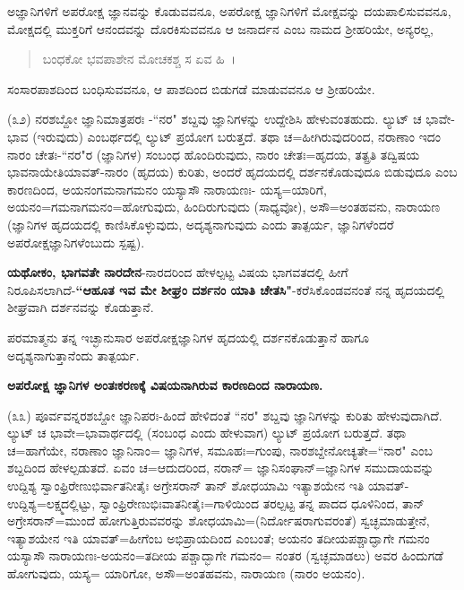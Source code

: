 
ಅಜ್ಞಾನಿಗಳಿಗೆ ಅಪರೋಕ್ಷ ಜ್ಞಾನವನ್ನು ಕೊಡುವವನೂ, ಅಪರೋಕ್ಷ ಜ್ಞಾನಿಗಳಿಗೆ ಮೋಕ್ಷವನ್ನು ದಯಪಾಲಿಸುವವನೂ, ಮೋಕ್ಷದಲ್ಲಿ ಮುಕ್ತರಿಗೆ ಆನಂದವನ್ನು ದೊರಕಿಸುವವನೂ ಆ ಜನಾರ್ದನ ಎಂಬ ನಾಮದ ಶ‍್ರೀಹರಿಯೇ, ಅನ್ಯರಲ್ಲ,

\begin{verse}
ಬಂಧಕೋ ಭವಪಾಶೇನ ಮೋಚಕಶ್ಚ ಸ ಏವ ಹಿ~।
\end{verse}


ಸಂಸಾರಪಾಶದಿಂದ ಬಂಧಿಸುವವನೂ, ಆ ಪಾಶದಿಂದ ಬಿಡುಗಡೆ ಮಾಡುವವನೂ ಆ ಶ‍್ರೀಹರಿಯೇ.

(೩೨) ನರಶಬ್ದೋ ಜ್ಞಾನಿಮಾತ್ರಪರಃ -``ನರ" ಶಬ್ದವು ಜ್ಞಾನಿಗಳನ್ನು ಉದ್ದೇಶಿಸಿ ಹೇಳುವಂತಹುದು. ಲ್ಯುಟ್ ಚ ಭಾವೇ-ಭಾವ (ಇರುವುದು) ಎಂಬರ್ಥದಲ್ಲಿ ಲ್ಯುಟ್ ಪ್ರಯೋಗ ಬರುತ್ತದೆ. ತಥಾ ಚ=ಹೀಗಿರುವುದರಿಂದ, ನರಾಣಾಂ ಇದಂ ನಾರಂ ಚೇತಃ-``ನರ"ರ (ಜ್ಞಾನಿಗಳ) ಸಂಬಂಧ ಹೊಂದಿರುವುದು, ನಾರಂ ಚೇತಃ=ಹೃದಯ, ತತ್ಪ್ರತಿ ತದ್ವಿಷಯ ಭಾವನಾಯೇತಿಯಾವತ್-ನಾರಂ (ಹೃದಯ) ಕುರಿತು, ಅಂದರೆ ಹೃದಯದಲ್ಲಿ ದರ್ಶನಕೊಡುವುದೂ ಬಿಡುವುದೂ ಎಂಬ ಕಾರಣದಿಂದ, ಅಯನಂಗಮನಾಗಮನಂ ಯಸ್ಯಾಸೌ ನಾರಾಯಣಃ- ಯಸ್ಯ=ಯಾರಿಗೆ, ಅಯನಂ=ಗಮನಾಗಮನಂ=ಹೋಗುವುದು, ಹಿಂದಿರುಗುವುದು (ಸಾಧ್ಯವೋ), ಅಸೌ=ಅಂತಹವನು, ನಾರಾಯಣ (ಜ್ಞಾನಿಗಳ ಹೃದಯದಲ್ಲಿ ಕಾಣಿಸಿಕೊಳ್ಳುವುದು, ಅದೃಶ್ಯನಾಗುವುದು ಎಂದು ತಾತ್ಪರ್ಯ, ಜ್ಞಾನಿಗಳೆಂದರೆ ಅಪರೋಕ್ಷಜ್ಞಾನಿಗಳೆಂಬುದು ಸ್ಪಷ್ಟ).

\textbf{ಯಥೋಕಂ, ಭಾಗವತೇ ನಾರದೇನ}-ನಾರದರಿಂದ ಹೇಳಲ್ಪಟ್ಟ ವಿಷಯ ಭಾಗವತದಲ್ಲಿ ಹೀಗೆ ನಿರೂಪಿಸಲಾಗಿದೆ-\textbf{``ಆಹೂತ ಇವ ಮೇ ಶೀಘ್ರಂ ದರ್ಶನಂ ಯಾತಿ ಚೇತಸಿ"}-ಕರೆಸಿಕೊಂಡವನಂತೆ ನನ್ನ ಹೃದಯದಲ್ಲಿ ಶೀಘ್ರವಾಗಿ ದರ್ಶನವನ್ನು ಕೊಡುತ್ತಾನೆ.

ಪರಮಾತ್ಮನು ತನ್ನ ಇಚ್ಛಾನುಸಾರ ಅಪರೋಕ್ಷಜ್ಞಾನಿಗಳ ಹೃದಯಲ್ಲಿ ದರ್ಶನಕೊಡುತ್ತಾನೆ ಹಾಗೂ ಅದೃಶ್ಯನಾಗುತ್ತಾನೆಂದು ತಾತ್ಪರ್ಯ.

\begin{center}
\textbf{ಅಪರೋಕ್ಷ ಜ್ಞಾನಿಗಳ ಅಂತಃಕರಣಕ್ಕೆ ವಿಷಯನಾಗಿರುವ ಕಾರಣದಿಂದ ನಾರಾಯಣ.}
\end{center}

(೩೩) ಪೂರ್ವವನ್ನರಶಬ್ದೋ ಜ್ಞಾನಿಪರಃ-ಹಿಂದೆ ಹೇಳಿದಂತೆ ``ನರ" ಶಬ್ದವು ಜ್ಞಾನಿಗಳನ್ನು ಕುರಿತು ಹೇಳುವುದಾಗಿದೆ. ಲ್ಯುಟ್ ಚ ಭಾವೇ=ಭಾವಾರ್ಥದಲ್ಲಿ (ಸಂಬಂಧ ಎಂದು ಹೇಳುವಾಗ) ಲ್ಯುಟ್ ಪ್ರಯೋಗ ಬರುತ್ತದೆ. ತಥಾ ಚ=ಹಾಗೆಯೇ, ನರಾಣಾಂ ಜ್ಞಾನಿನಾಂ= ಜ್ಞಾನಿಗಳ, ಸಮೂಹಃ=ಗುಂಪು, ನಾರಶಬ್ದೇನೋಚ್ಯತೇ=``ನಾರ" ಎಂಬ ಶಬ್ದದಿಂದ ಹೇಳಲ್ಪಡುತದೆ. ಏವಂ ಚ=ಆದುದರಿಂದ, ನರಾನ್= ಜ್ಞಾನಿಸಂಘಾನ್=ಜ್ಞಾನಿಗಳ ಸಮುದಾಯವನ್ನು ಉದ್ದಿಶ್ಯ ಸ್ವಾಂಫ್ರಿರೇಣುಭಿರ್ವಾತನೀತೈಃ ಅಗ್ರೇಸರಾನ್ ತಾನ್ ಶೋಧಯಾಮಿ ಇತ್ಯಾಶಯೇನ ಇತಿ ಯಾವತ್‌-ಉದ್ದಿಶ್ಯ=ಲಕ್ಷ್ಮದಲ್ಲಿಟ್ಟು, ಸ್ವಾಂಫ್ರಿರೇಣುಭಿಃವಾತನೀತೈಃ=ಗಾಳಿಯಿಂದ ತರಲ್ಪಟ್ಟ ತನ್ನ ಪಾದದ ಧೂಳಿನಿಂದ, ತಾನ್ ಅಗ್ರೇಸರಾನ್=ಮುಂದೆ ಹೋಗುತ್ತಿರುವವರನ್ನು ಶೋಧಯಾಮಿ=(ನಿರ್ದೋಷರಾಗುವರಂತೆ) ಸ್ವಚ್ಛಮಾಡುತ್ತೇನೆ, ಇತ್ಯಾಶಯೇನ ಇತಿ ಯಾವತ್=ಹೀಗೆಂಬ ಅಭಿಪ್ರಾಯದಿಂದ ಎಂಬಂತೆ; ಅಯನಂ ತದೀಯಪಶ್ಚಾದ್ಘಾಗೇ ಗಮನಂ ಯಸ್ಯಾಸೌ ನಾರಾಯಣಃ-ಅಯನಂ=ತದೀಯ ಪಶ್ಚಾದ್ಭಾಗೇ ಗಮನಂ= ನಂತರ (ಸ್ವಚ್ಛಮಾಡಲು) ಅವರ ಹಿಂದುಗಡೆ ಹೋಗುವುದು, ಯಸ್ಯ= ಯಾರಿಗೋ, ಅಸೌ=ಅಂತಹವನು, ನಾರಾಯಣ (ನಾರಂ ಅಯನಂ).

